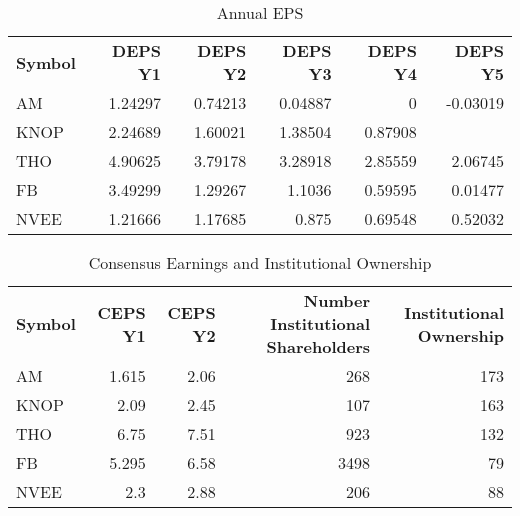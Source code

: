 \documentclass{article}
\begin{document}
\begin{table}[htbp]
  \centering
  \caption{Annual EPS}
    \begin{tabular}{lrrrrr}
    \multicolumn{1}{p{4.215em}}{\textbf{Symbol}} & \multicolumn{1}{p{4.215em}}{\textbf{DEPS Y1}} & \multicolumn{1}{p{4.215em}}{\textbf{DEPS Y2}} & \multicolumn{1}{p{4.215em}}{\textbf{DEPS Y3}} & \multicolumn{1}{p{4.215em}}{\textbf{DEPS Y4}} & \multicolumn{1}{p{4.215em}}{\textbf{DEPS Y5}} \\
    AM    & 1.24297 & 0.74213 & 0.04887 & 0     & -0.03019 \\
    KNOP  & 2.24689 & 1.60021 & 1.38504 & 0.87908 &  \\
    THO   & 4.90625 & 3.79178 & 3.28918 & 2.85559 & 2.06745 \\
    FB    & 3.49299 & 1.29267 & 1.1036 & 0.59595 & 0.01477 \\
    NVEE  & 1.21666 & 1.17685 & 0.875 & 0.69548 & 0.52032 \\
    \end{tabular}%
  \label{tab:addlabel}%
\end{table}%

\begin{table}[htbp]
  \centering
  \caption{Consensus Earnings and Institutional Ownership}
    \begin{tabular}{lrrrr}
    \multicolumn{1}{p{4.215em}}{\textbf{Symbol}} & \multicolumn{1}{p{4.215em}}{\textbf{CEPS Y1}} & \multicolumn{1}{p{4.215em}}{\textbf{CEPS Y2}} & \multicolumn{1}{p{4.215em}}{\textbf{Number Institutional Shareholders}} & \multicolumn{1}{p{4.215em}}{\textbf{Institutional Ownership}} \\
    AM    & 1.615 & 2.06  & 268   & 173 \\
    KNOP  & 2.09  & 2.45  & 107   & 163 \\
    THO   & 6.75  & 7.51  & 923   & 132 \\
    FB    & 5.295 & 6.58  & 3498  & 79 \\
    NVEE  & 2.3   & 2.88  & 206   & 88 \\
    \end{tabular}%
  \label{tab:addlabel}%
\end{table}%
\end{document}
